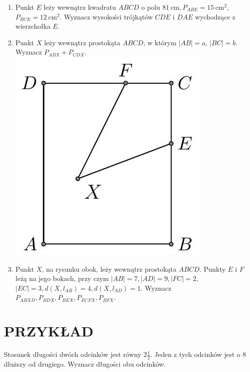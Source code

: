 \documentclass[10pt]{article}
\begin{document}
\begin{enumerate}
  \item Punkt \(E\) leży wewnątrz kwadratu \(A B C D\) o polu \(81 \mathrm{~cm}, P_{A B E}=15 \mathrm{~cm}^{2}\), \(P_{B C E}=12 \mathrm{~cm}^{2}\). Wyznacz wysokości trójkątów \(C D E\) i \(D A E\) wychodzące z wierzchołka \(E\).
  \item Punkt \(X\) leży wewnątrz prostokąta \(A B C D\), w którym \(|A B|=a\), \(|B C|=b\). Wyznacz \(P_{A B X}+P_{C D X}\).\\
\includegraphics[max width=\textwidth, center]{2024_11_21_71f62bd117d375398909g-033}
  \item Punkt \(X\), na rysunku obok, leży wewnątrz prostokąta \(A B C D\). Punkty \(E\) i \(F\) leżą na jego bokach, przy czym \(|A B|=7,|A D|=9,|F C|=2\), \(|E C|=3, d\left(X, l_{A B}\right)=4, d\left(X, l_{A D}\right)=1\). Wyznacz \(P_{A B X D}, P_{B D X}, P_{B E X}, P_{E C F X}, P_{B F X}\).
\end{enumerate}

\section*{PRZYKŁAD}
Stosunek długości dwóch odcinków jest równy \(2 \frac{1}{2}\). Jeden z tych odcinków jest o 8 dłuższy od drugiego. Wyznacz długości obu odcinków.
\end{document}

